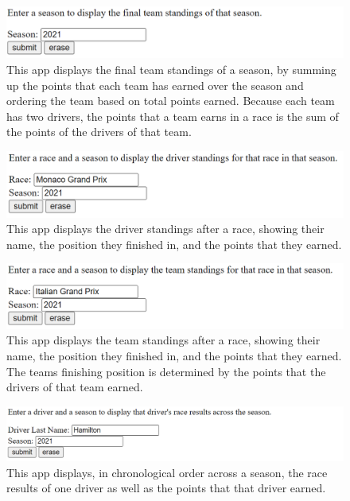 \documentclass{article} %
\begin{document}
\begin{figure}[H]
    \centering
    \includegraphics[scale=0.35]{2.PNG}
    \caption{This app displays the final team standings of a season,
    by summing up the points that each team has earned over the season
    and ordering the team based on total points earned. Because each
    team has two drivers, the points that a team earns in a race is the
    sum of the points of the drivers of that team.}
\end{figure}
\begin{figure}[H]
    \centering
    \includegraphics[scale=0.35]{3.PNG}
    \caption{This app displays the driver standings after a race,
    showing their name, the position they finished in, and the points
    that they earned.}
\end{figure}
\begin{figure}[H]
    \centering
    \includegraphics[scale=0.35]{4.PNG}
    \caption{This app displays the team standings after a race,
    showing their name, the position they finished in, and the points
    that they earned. The teams finishing position is determined by the
    points that the drivers of that team earned.}
\end{figure}
\begin{figure}[H]
    \centering
    \includegraphics[scale=0.35]{5.PNG}
    \caption{This app displays, in chronological order across a season,
    the race results of one driver as well as the points that that
    driver earned.}
\end{figure}
\end{document}
